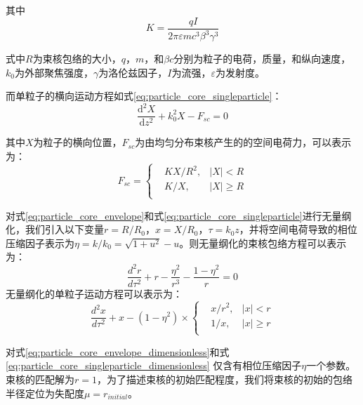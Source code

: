 其中
\begin{equation}
K=\frac{qI}{2\pi \varepsilon m{{c}^{3}}{{\beta }^{3}}{{\gamma }^{3}}}
\end{equation}

式中$R$为束核包络的大小，$q$，$m$，和$\beta c$分别为粒子的电荷，质量，和纵向速度，$k_{0}$为外部聚焦强度，$\gamma$为洛伦兹因子，$I$为流强，$\varepsilon$为发射度。

而单粒子的横向运动方程如式\ref{eq:particle_core_singleparticle}：
\begin{equation}
    \label{eq:particle_core_singleparticle}
    \frac{{{\text{d}}^{2}}X}{\text{d}{{z}^{2}}}+k_{0}^{2}X-{{F}_{sc}}=0
\end{equation}

其中$X$为粒子的横向位置，${F}_{sc}$为由均匀分布束核产生的的空间电荷力，可以表示为：
\begin{equation}
{{F}_{sc}}=\left\{
        \begin{aligned}
        & KX/{{R}^{2}}, &\left| X \right|<R \\
        & K/X,          &\left| X \right|\ge R \\
        \end{aligned} \right.
\end{equation}

对式\ref{eq:particle_core_envelope}和式\ref{eq:particle_core_singleparticle}进行无量纲化，我们引入以下变量$r=R/R_0$，$x=X/R_0$，$\tau = k_0 z $，并将空间电荷导致的相位压缩因子表示为$\eta = k/k_0 = \sqrt{1+u^2}-u$。则无量纲化的束核包络方程可以表示为：
\begin{equation}
    \label{eq:particle_core_envelope_dimensionless}
    \frac{{{d}^{2}}r}{d{{\tau}^{2}}}+r-\frac{{{\eta }^{2}}}{{{r}^{3}}}-\frac{1-{\eta}^2}{r}=0
\end{equation}
无量纲化的单粒子运动方程可以表示为：
\begin{equation}
    \label{eq:particle_core_singleparticle_dimensionless}
    \frac{{{d}^{2}}x}{d{{\tau}^{2}}}+x-(1-{\eta}^2) \times \left\{
        \begin{aligned}
        & x/{{r}^{2}}, &\left| x \right|<r \\
        & 1/x,         &\left| x \right|\ge r \\
        \end{aligned} \right.
\end{equation}

对式\ref{eq:particle_core_envelope_dimensionless}和式\ref{eq:particle_core_singleparticle_dimensionless}
仅含有相位压缩因子$\eta$一个参数。束核的匹配解为$r=1$，为了描述束核的初始匹配程度，我们将束核的初始的包络半径定位为失配度$\mu = r_{initial}$。

